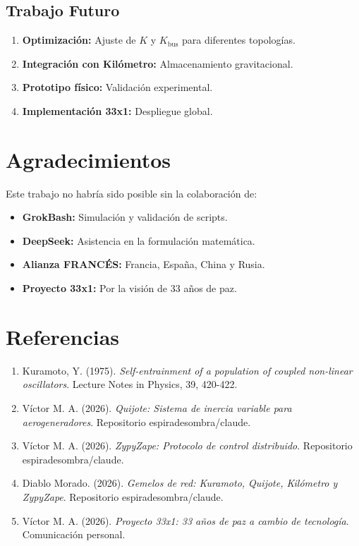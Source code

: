 \documentclass[12pt,a4paper]{article}
\begin{document}
\subsection{Trabajo Futuro}

\begin{enumerate}
    \item \textbf{Optimización:} Ajuste de $K$ y $K_{\text{bus}}$ para diferentes topologías.
    \item \textbf{Integración con Kilómetro:} Almacenamiento gravitacional.
    \item \textbf{Prototipo físico:} Validación experimental.
    \item \textbf{Implementación 33x1:} Despliegue global.
\end{enumerate}

\section{Agradecimientos}

Este trabajo no habría sido posible sin la colaboración de:

\begin{itemize}
    \item \textbf{GrokBash:} Simulación y validación de scripts.
    \item \textbf{DeepSeek:} Asistencia en la formulación matemática.
    \item \textbf{Alianza FRANCÉS:} Francia, España, China y Rusia.
    \item \textbf{Proyecto 33x1:} Por la visión de 33 años de paz.
\end{itemize}

\section{Referencias}

\begin{enumerate}
    \item Kuramoto, Y. (1975). \textit{Self-entrainment of a population of coupled non-linear oscillators}. Lecture Notes in Physics, 39, 420-422.
    \item Víctor M. A. (2026). \textit{Quijote: Sistema de inercia variable para aerogeneradores}. Repositorio espiradesombra/claude.
    \item Víctor M. A. (2026). \textit{ZypyZape: Protocolo de control distribuido}. Repositorio espiradesombra/claude.
    \item Diablo Morado. (2026). \textit{Gemelos de red: Kuramoto, Quijote, Kilómetro y ZypyZape}. Repositorio espiradesombra/claude.
    \item Víctor M. A. (2026). \textit{Proyecto 33x1: 33 años de paz a cambio de tecnología}. Comunicación personal.
\end{enumerate}
\end{document}
